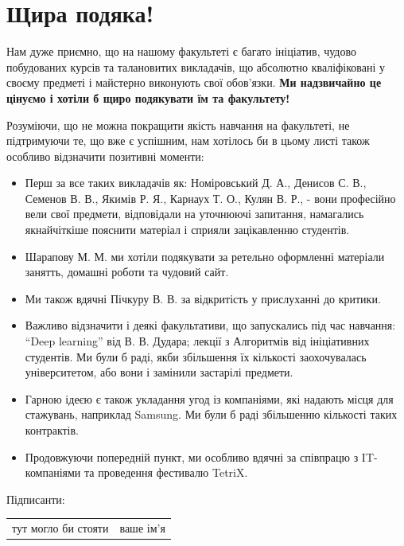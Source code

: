 \documentclass[14pt, a4paper]{extarticle}  %
\begin{document}
\newpage
\section{Щира подяка!}
Нам дуже приємно, що на нашому факультеті є багато ініціатив, чудово побудованих курсів та талановитих викладачів, що абсолютно кваліфіковані у своєму предметі і майстерно виконують свої обов'язки. \textbf{Ми надзвичайно це цінуємо і хотіли б щиро подякувати їм та факультету! }\medskip

Розуміючи, що не можна покращити якість навчання на факультеті, не підтримуючи те, що вже є успішним, нам хотілось би в цьому листі також особливо  відзначити позитивні моменти:
\begin{itemize}
    \item Перш за все таких викладачів як: Номіровський Д. А., Денисов С. В., Семенов В. В., Якимів Р. Я., Карнаух Т. О., Кулян В. Р., - вони професійно вели свої предмети, відповідали на уточнюючі запитання, намагались якнайчіткіше пояснити матеріал і сприяли зацікавленню студентів. 

\item Шарапову М. М.  ми хотіли подякувати за ретельно оформленні матеріали занятть, домашні роботи та чудовий сайт. 

\item Ми також вдячні Пічкуру В. В. за відкритість у прислуханні до критики.

\item Важливо відзначити і деякі факультативи, що запускались під час навчання: ``Deep learning'' від В. В. Дудара; лекції з Алгоритмів від ініціативних студентів. Ми були б раді, якби збільшення їх кількості заохочувалась університетом, або вони і замінили застарілі предмети.

\item Гарною ідеєю є також укладання угод із компаніями, які надають місця для стажувань, наприклад Samsung. Ми були б раді збільшенню кількості таких контрактів.

\item Продовжуючи попередній пункт, ми особливо вдячні за співпрацю з IT-компаніями та проведення фестивалю TetriX. 
\end{itemize}

\newpage
Підписанти:

\begin{tabular}{c|c}
\hline
тут могло би стояти & ваше ім'я \\
\end{tabular}
\end{document}
